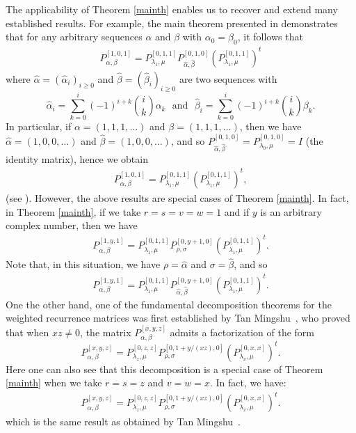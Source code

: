 \documentclass{amsart}
\begin{document}
The applicability of Theorem \ref{mainth} enables us to recover and extend many established results. 
For example, the main theorem presented in \cite[Theorem 1]{MP} demonstrates that for any arbitrary sequences $\alpha$ and $\beta$ with $\alpha_0= \beta_0$, it follows that 
\begin{align*}
P_{\alpha, \beta}^{[1, 0, 1]}=P_{\lambda_1, \mu}^{[0, 1, 1]}  P_{\hat{\alpha}, \hat{\beta}}^{[0, 1, 0]} 
(P_{\lambda_1, \mu}^{[0, 1, 1]})^t
\end{align*} 
where $\hat{\alpha}=(\hat{\alpha}_{i})_{i\geq 0}$ and
$\hat{\beta}=(\hat{\beta}_{i})_{i\geq 0}$ are two sequences with
$$\hat{\alpha}_{i}=\sum_{k=0}^{i}(-1)^{i+k}{i\choose k}\alpha_k \ \ \
\mbox{and} \ \ \
\hat{\beta}_{i}=\sum_{k=0}^{i}(-1)^{i+k}{i\choose k}\beta_k.$$
In particular, if $\alpha=(1, 1, 1, \ldots)$ and $\beta=(1, 1, 1, \ldots)$, then we have   
$\hat{\alpha}=(1, 0, 0, \ldots)$ and  $\hat{\beta}=(1, 0, 0, \ldots)$, and so $P_{\hat{\alpha}, \hat{\beta}}^{[0, 1, 0]}=P_{\lambda_0, \mu}^{[0, 1, 0]} =I$ (the identity matrix), hence we obtain
\begin{align*}
P_{\alpha, \beta}^{[1, 0, 1]}=P_{\lambda_1, \mu}^{[0, 1, 1]} 
(P_{\lambda_1, \mu}^{[0, 1, 1]})^t,
\end{align*} 
(see \cite{ES}). However, the above results are special cases of Theorem \ref{mainth}. In fact, in Theorem \ref{mainth},  if we take $r=s=v=w=1$ and if $y$ is an arbitrary complex number, then we have 
\begin{align*}
P_{\alpha, \beta}^{[1, y, 1]}=P_{\lambda_1, \mu}^{[0, 1, 1]}  P_{\rho, \sigma}^{[0, y+1, 0]} 
(P_{\lambda_1, \mu}^{[0, 1, 1]})^t.
\end{align*} 
Note that, in this situation, we have $\rho=\hat{\alpha}$ and $\sigma=\hat{\beta}$, and so 
\begin{align*}
P_{\alpha, \beta}^{[1, y, 1]}=P_{\lambda_1, \mu}^{[0, 1, 1]}  P_{\hat{\alpha}, \hat{\beta}}^{[0, y+1, 0]} 
(P_{\lambda_1, \mu}^{[0, 1, 1]})^t.
\end{align*} 
One the other hand, one of the fundamental decomposition theorems for the weighted recurrence matrices was first established by Tan Mingshu~\cite{T}, who proved that when $xz\neq0$, the matrix $P_{\alpha, \beta}^{[x, y, z]}$ admits a factorization of the form 
\[
P_{\alpha, \beta}^{[x, y, z]}=P_{\lambda_z, \mu}^{[0, z, z]} P_{\rho, \sigma}^{[0, 1+y/(xz), 0]} (P_{\lambda_x, \mu}^{[0, x, x]} )^t.
\]
Here one can also see that this decomposition is a special case of Theorem \ref{mainth} when we take $r=s=z$ and $v=w=x$. In fact, we have:
\begin{align*}
P_{\alpha, \beta}^{[x, y, z]}=P_{\lambda_z, \mu}^{[0, z, z]} P_{\rho, \sigma}^{[0, 1+y/(xz), 0]} (P_{\lambda_x, \mu}^{[0, x, x]})^t.
\end{align*}
which is the same result as obtained by Tan Mingshu~\cite{T}.
\end{document}
